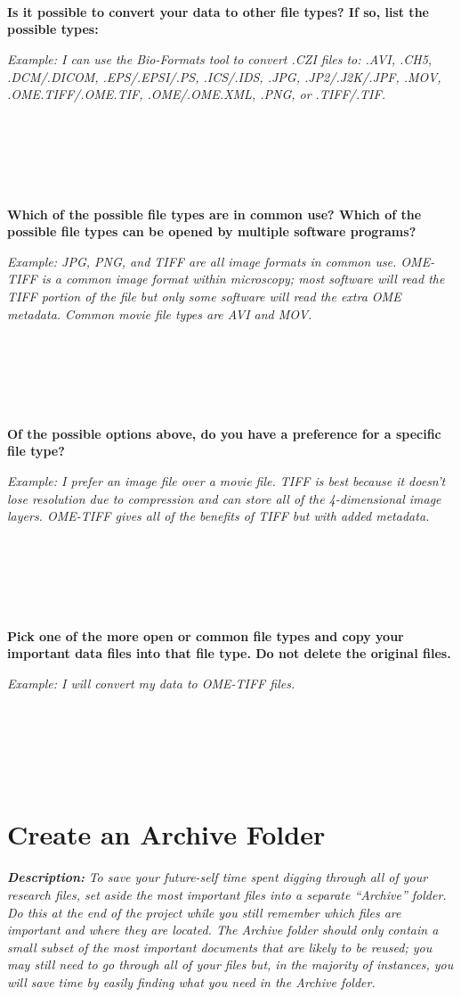 \documentclass[
]{book}
\begin{document}
~

~

~

\textbf{Is it possible to convert your data to other file types? If so, list the possible types:}

\emph{Example: I can use the Bio-Formats tool to convert .CZI files to: .AVI, .CH5, .DCM/.DICOM, .EPS/.EPSI/.PS, .ICS/.IDS, .JPG, .JP2/.J2K/.JPF, .MOV, .OME.TIFF/.OME.TIF, .OME/.OME.XML, .PNG, or .TIFF/.TIF.}

~

~

~

\textbf{Which of the possible file types are in common use? Which of the possible file types can be opened by multiple software programs?}

\emph{Example: JPG, PNG, and TIFF are all image formats in common use. OME-TIFF is a common image format within microscopy; most software will read the TIFF portion of the file but only some software will read the extra OME metadata. Common movie file types are AVI and MOV.}

~

~

~

\textbf{Of the possible options above, do you have a preference for a specific file type?}

\emph{Example: I prefer an image file over a movie file. TIFF is best because it doesn't lose resolution due to compression and can store all of the 4-dimensional image layers. OME-TIFF gives all of the benefits of TIFF but with added metadata.}

~

~

~

\textbf{Pick one of the more open or common file types and copy your important data files into that file type. Do not delete the original files.}

\emph{Example: I will convert my data to OME-TIFF files.}

~

~

~

\hypertarget{archive-folder}{%
\section{Create an Archive Folder}\label{archive-folder}}

\textbf{\emph{Description:}} \emph{To save your future-self time spent digging through all of your research files, set aside the most important files into a separate ``Archive'' folder. Do this at the end of the project while you still remember which files are important and where they are located. The Archive folder should only contain a small subset of the most important documents that are likely to be reused; you may still need to go through all of your files but, in the majority of instances, you will save time by easily finding what you need in the Archive folder.}
\end{document}
